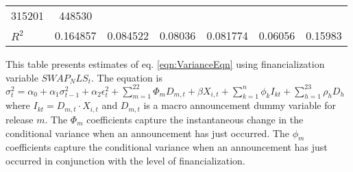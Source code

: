\begin{sidewaystable}
{\begin{tabular}{@{}lllllllllllll@{}}
315201 }                                                   & \multicolumn{2}{c}{ 448530 }                                                 \\ \textbf{$R^2$}             &\multicolumn{2}{c}{ 0.164857 }                                                 & \multicolumn{2}{c}{ 0.084522 }                                                 & \multicolumn{2}{c}{ 0.08036 }                                                 & \multicolumn{2}{c}{ 0.081774 }                                                 & \multicolumn{2}{c}{ 0.06056 }                                                   & \multicolumn{2}{c}{ 0.15983 }                                                 \\ \bottomrule 
\end{tabular}
}
\begin{tablenotes}\item 
        \singlespacing
        \footnotesize
        This table presents estimates of eq. \ref{eqn:VarianceEqn} using financialization variable $SWAP_NLS_t$. The equation is $\sigma_{t}^2=\alpha_0+\alpha_1 \sigma_{t-1}^2+\alpha_2 \epsilon_t^2 +\sum_{m=1}^{22} \Phi_m D_{m,t}+\beta X_{i,t}+\sum_{k=1}^n \phi_k I_{kt} + \sum_{h=1}^{23} \rho_h D_h$ where $I_{kt}=D_{m,t} \cdot X_{i,t}$ and $D_{m,t}$ is a macro announcement dummy variable for release $m$. The $\Phi_m$ coefficients capture the instantaneous change in the conditional variance when an announcement has just occurred. The $\phi_m$ coefficients capture the conditional variance when an announcement has just occurred in conjunction with the level of financialization.
\end{tablenotes}
\end{sidewaystable}

